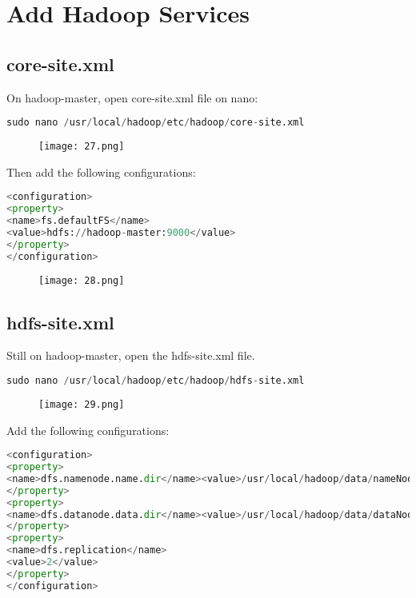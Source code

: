 \documentclass[onecolumn]{article}
\begin{document}
\section{Add Hadoop Services}

\subsection{core-site.xml}

On hadoop-master, open core-site.xml file on nano:

\begin{lstlisting}[language=Python, caption= a ]
sudo nano /usr/local/hadoop/etc/hadoop/core-site.xml
\end{lstlisting}

\begin{figure}[ht!]
\centering
\texttt{[image: 27.png]}
\caption{\label{}}
\end{figure}


Then add the following configurations:

\begin{lstlisting}[language=Python, caption= a ]
<configuration>
<property>
<name>fs.defaultFS</name>
<value>hdfs://hadoop-master:9000</value>
</property>
</configuration>
\end{lstlisting}

\begin{figure}[ht!]
\centering
\texttt{[image: 28.png]}
\caption{\label{}}
\end{figure}

\subsection{hdfs-site.xml}

Still on hadoop-master, open the hdfs-site.xml file.

\begin{lstlisting}[language=Python, caption= a ]
sudo nano /usr/local/hadoop/etc/hadoop/hdfs-site.xml
\end{lstlisting}

\begin{figure}[ht!]
\centering
\texttt{[image: 29.png]}
\caption{\label{}}
\end{figure}


Add the following configurations:

\begin{lstlisting}[language=Python, caption= a ]
<configuration>
<property>
<name>dfs.namenode.name.dir</name><value>/usr/local/hadoop/data/nameNode</value>
</property>
<property>
<name>dfs.datanode.data.dir</name><value>/usr/local/hadoop/data/dataNode</value>
</property>
<property>
<name>dfs.replication</name>
<value>2</value>
</property>
</configuration>
\end{lstlisting}
\end{document}
